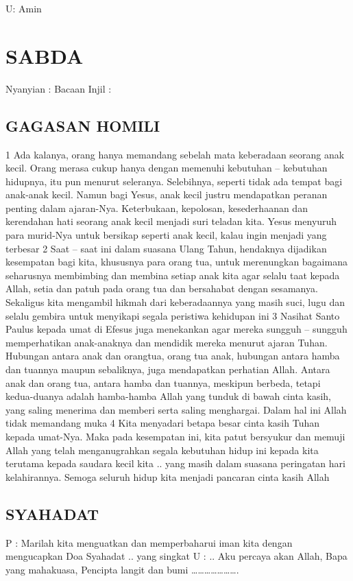 \documentclass{article}
\begin{document}
U: Amin  

\section[SABDA]{SABDA }
 Nyanyian : Bacaan Injil :  

\subsection[GAGASAN HOMILI]{GAGASAN HOMILI }
 1 Ada kalanya, orang hanya memandang sebelah mata keberadaan seorang anak kecil. Orang merasa cukup hanya dengan
memenuhi kebutuhan -- kebutuhan hidupnya, itu pun menurut seleranya. Selebihnya, seperti tidak ada tempat bagi
anak-anak kecil. Namun bagi Yesus, anak kecil justru mendapatkan peranan penting dalam ajaran-Nya. Keterbukaan,
kepolosan, kesederhaanan dan kerendahan hati seorang anak kecil menjadi suri teladan kita. Yesus menyuruh para
murid-Nya untuk bersikap seperti anak kecil, kalau ingin menjadi yang terbesar  2 Saat -- saat ini dalam suasana Ulang
Tahun, hendaknya dijadikan kesempatan bagi kita, khususnya para orang tua, untuk merenungkan bagaimana seharusnya
membimbing dan membina setiap anak kita agar selalu taat kepada Allah, setia dan patuh pada orang tua dan bersahabat
dengan sesamanya. Sekaligus kita mengambil hikmah dari keberadaannya yang masih suci, lugu dan selalu gembira untuk
menyikapi segala peristiwa kehidupan ini  3 Nasihat Santo Paulus kepada umat di Efesus juga menekankan agar mereka
sungguh -- sungguh memperhatikan anak-anaknya dan mendidik mereka menurut ajaran Tuhan. Hubungan antara anak dan
orangtua, orang tua anak, hubungan antara hamba dan tuannya maupun sebaliknya, juga mendapatkan perhatian Allah. Antara
anak dan orang tua, antara hamba dan tuannya, meskipun berbeda, tetapi kedua-duanya adalah hamba-hamba Allah yang
tunduk di bawah cinta kasih, yang saling menerima dan memberi serta saling menghargai. Dalam hal ini Allah tidak
memandang muka  4 Kita menyadari betapa besar cinta kasih Tuhan kepada umat-Nya. Maka pada kesempatan ini, kita patut
bersyukur dan memuji Allah yang telah menganugrahkan segala kebutuhan hidup ini kepada kita terutama kepada saudara
kecil kita .. yang masih dalam suasana peringatan hari kelahirannya. Semoga seluruh hidup kita menjadi pancaran cinta
kasih Allah 

\subsection{SYAHADAT}
 P : Marilah kita menguatkan dan memperbaharui iman kita dengan mengucapkan Doa Syahadat .. yang singkat U : .. Aku
percaya akan Allah, Bapa yang mahakuasa, Pencipta langit dan bumi {\dots}{\dots}{\dots}{\dots}{\dots}{\dots}{\dots}.  
\end{document}
